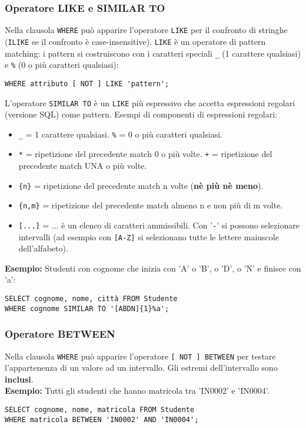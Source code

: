 \documentclass[a4paper, 10pt, titlepage]{article}
\begin{document}
	\subsubsection{Operatore LIKE e SIMILAR TO}
		Nella clausola \lstinline|WHERE| può apparire l’operatore \lstinline|LIKE| per il confronto di
		stringhe (\lstinline|ILIKE| se il confronto è case-insensitive). \lstinline|LIKE| è un operatore di pattern matching: i pattern si costruiscono con i caratteri speciali \lstinline|_| (1 carattere qualsiasi) e \lstinline|%| (0 o più caratteri qualsiasi):
		\begin{lstlisting}
WHERE attributo [ NOT ] LIKE 'pattern';
		\end{lstlisting}
		L’operatore \lstinline|SIMILAR TO| è un \lstinline|LIKE| più espressivo che accetta
		espressioni regolari (versione SQL) come pattern. Esempi di componenti di
		espressioni regolari:
		\begin{itemize}
			\item \lstinline|_| = 1 carattere qualsiasi. \lstinline|%| = 0 o più caratteri qualsiasi.
			\item \lstinline|*| = ripetizione del precedente match 0 o più volte. 
				\lstinline|+| = ripetizione del precedente match UNA o più volte.
			\item \lstinline|{n}| = ripetizione del precedente match n volte (\textbf{nè più nè meno}).
			\item \lstinline|{n,m}| = ripetizione del precedente match almeno n e non più di m volte.
			\item \lstinline|[...]| = ... è un elenco di caratteri ammissibili. Con '\lstinline|-|' si possono selezionare intervalli (ad esempio con \lstinline|[A-Z]| si selezionano tutte le lettere maiuscole dell'alfabeto).
		\end{itemize}
		\textbf{Esempio:} Studenti con cognome che inizia con 'A' o 'B', o 'D', o 'N' e finisce con 'a':
		\begin{lstlisting}
SELECT cognome, nome, città FROM Studente
WHERE cognome SIMILAR TO '[ABDN]{1}%a';
		\end{lstlisting}
		
	\subsubsection{Operatore BETWEEN}
		Nella clausola \lstinline|WHERE| può apparire l’operatore \lstinline|[ NOT ] BETWEEN| per testare
		l’appartenenza di un valore ad un intervallo. Gli estremi dell'intervallo sono \textbf{inclusi}.\medskip \\
		\textbf{Esempio:} Tutti gli studenti che hanno matricola tra 'IN0002' e 'IN0004'.
	\begin{lstlisting}
SELECT cognome, nome, matricola FROM Studente
WHERE matricola BETWEEN 'IN0002' AND 'IN0004';
	\end{lstlisting}
	
\end{document}
